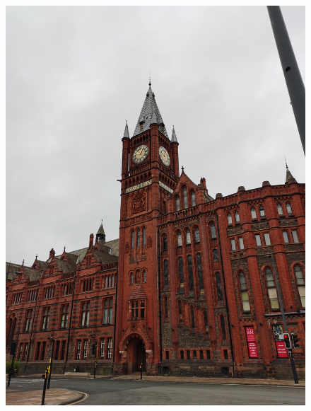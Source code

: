 \documentclass[11pt]{article}
\begin{document}
\begin{figure}[H]
    \centering
    \includegraphics[width=\textwidth]{1E.jpg}
\end{figure}
\end{document}
